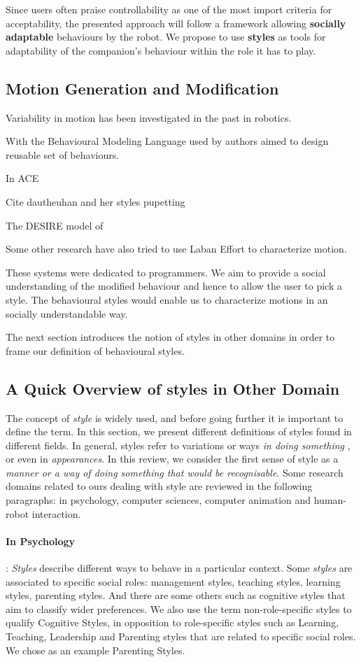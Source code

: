 \documentclass[a4paper,twocolumn]{svjour3}
\begin{document}
Since users often praise controllability as one of the most import criteria for acceptability, the presented approach will follow a framework allowing \textbf{socially adaptable} behaviours by the robot.
We propose to use \textbf{styles} as tools for adaptability of the companion's behaviour within the role it has to play.

\subsection{Motion Generation and Modification}
Variability in motion has been investigated in the past in robotics. 

With the Behavioural Modeling Language used by \cite{} authors aimed to design reusable set of behaviours. 

In ACE \cite{} 

Cite dautheuhan and her styles pupetting

The DESIRE model of \cite{}

Some other research have also tried to use Laban Effort to characterize motion. 

These systems were dedicated to programmers. 
We aim to provide a social understanding of the modified behaviour and hence to allow the user to pick a style.
The behavioural styles would enable us to characterize motions in an socially understandable way. 

The next section introduces the notion of styles in other domains in order to frame our definition of behavioural styles. 

\subsection{A Quick Overview of styles in Other Domain}
\label{sec:soa_styles}
The concept of \textit{style} is widely used, and before going further it is important to define the term. 
In this section, we present different definitions of  styles found in  different fields.
In general,  styles refer to variations or ways  \textit{in doing something }, or even in \textit{appearances}.
In this review, we consider the first sense of style as a\textit{ manner or a way of doing something that would be recognisable}.
Some research domains related to ours dealing with style are reviewed in the following paragraphs: in psychology, computer sciences, computer animation and  human-robot interaction. 

\paragraph{In Psychology}:
\label{par:psycho}
\textit{Styles} describe different ways to behave in a particular context. 
Some \textit{styles} are associated to specific social roles: management styles, teaching styles, learning styles, parenting styles. 
And there are some others such as cognitive styles that aim to classify wider preferences.
We also use the term non-role-specific styles to qualify Cognitive Styles, in opposition to role-specific styles such as  Learning, Teaching, Leadership and Parenting styles that are related to specific social roles. 
We chose as an example Parenting Styles.
\end{document}
